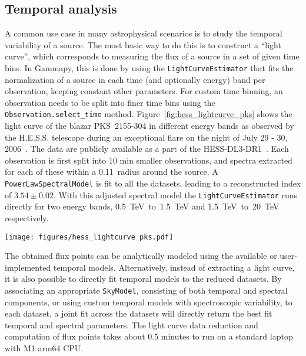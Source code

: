 \documentclass[longauth]{aa}
\newcommand{\code}[1]{\texttt{#1}}
\newcommand{\gammapy}{Gammapy\xspace}
\newcommand{\hess}{H.E.S.S.\xspace}
\begin{document}
\subsection{Temporal analysis}
\label{ssec:temporal-analysis}
A common use case in many astrophysical scenarios is to study the temporal
variability of a source. The most basic way to do this is to construct a
\enquote{light curve}, which corresponds to measuring the flux of a source
in a set of given time bins. In \gammapy, this
is done by using the \code{LightCurveEstimator} that fits the normalization of a
source in each time (and optionally energy) band per observation, keeping constant
other parameters.
For custom time binning, an observation needs to be split into finer time bins using
the \code{Observation.select\_time} method. Figure~\ref{fig:hess_lightcurve_pks}
shows the light curve of the blazar PKS~2155-304 in different energy bands as
observed by the \hess telescope during an exceptional flare on the night of
July 29 - 30, 2006~\cite{2009A&A...502..749A}. The data are publicly available 
as a part of the HESS-DL3-DR1~\cite{HESS_DR1}. Each observation is first split into 10 min smaller
observations, and spectra extracted for each of these within a 0.11\textdegree~radius
around the source. A \code{PowerLawSpectralModel} is fit to all the datasets, leading
to a reconstructed index of $3.54 \pm 0.02$. With this adjusted spectral model
the \code{LightCurveEstimator} runs directly for two energy bands,
\SI{0.5}{TeV}~to~\SI{1.5}{TeV} and \SI{1.5}{TeV}~to~\SI{20}{TeV} respectively.
%
\begin{figure*}[t]
    \sidecaption
        \texttt{[image: figures/hess\_lightcurve\_pks.pdf]}
        \caption{
        Binned PKS~2155-304 light curve in two different energy bands
        as observed by the \hess telescopes in 2006. The colored markers
        show the flux points in the different energy bands:
                the range from (\SI{0.5}{TeV}~to~\SI{1.5}{TeV} is shown in blue, while
                the range from \SI{1.5}{TeV}~to~\SI{20}{TeV}) is shown in orange.
                The horizontal error illustrates the width of the time bin of 10~min. The vertical
        error bars show the associated asymmetrical flux errors. The marker
        is set to the center of the time bin.
    }
    \label{fig:hess_lightcurve_pks}
\end{figure*}
%
The obtained flux points can be analytically modeled using the available or
user-implemented temporal models. Alternatively, instead of  extracting a
light curve, it is also possible to directly fit temporal models to the reduced
datasets. By associating an appropriate \code{SkyModel}, consisting of both temporal
and spectral components, or using custom temporal models with spectroscopic
variability, to each dataset, a joint fit across the datasets will directly
return the best fit temporal and spectral parameters. The light curve data reduction
and computation of flux points takes about $0.5$ minutes to run on a standard laptop with M1 arm64 CPU.
\end{document}
